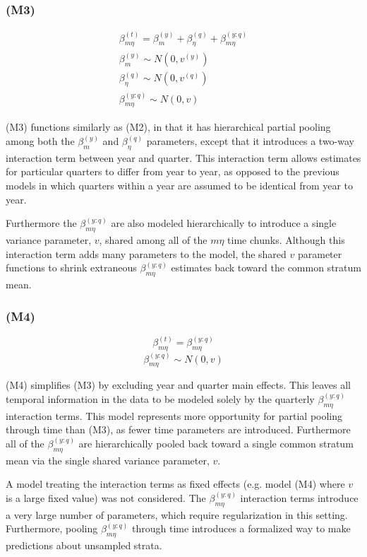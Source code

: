\documentclass[12pt]{article}
\begin{document}
\subsubsection{(M3)}\label{m3}

\begin{eqnarray*}
&\beta^{(t)}_{m\eta} = \beta^{(y)}_{m} + \beta^{(q)}_{\eta} + \beta^{(y:q)}_{m\eta} & \\
&\beta^{(y)}_{m} \sim N(0, v^{(y)}) & \\
&\beta^{(q)}_{\eta} \sim N(0, v^{(q)}) & \\
&\beta^{(y:q)}_{m\eta} \sim N(0, v) &
\end{eqnarray*}

(M3) functions similarly as (M2), in that it has hierarchical partial
pooling among both the \(\beta^{(y)}_{m}\) and \(\beta^{(q)}_{\eta}\)
parameters, except that it introduces a two-way interaction term between
year and quarter. This interaction term allows estimates for particular
quarters to differ from year to year, as opposed to the previous models
in which quarters within a year are assumed to be identical from year to
year.

Furthermore the \(\beta^{(y:q)}_{m\eta}\) are also modeled
hierarchically to introduce a single variance parameter, \(v\), shared
among all of the \(m\eta\) time chunks. Although this interaction term
adds many parameters to the model, the shared \(v\) parameter functions
to shrink extraneous \(\beta^{(y:q)}_{m\eta}\) estimates back toward the
common stratum mean.

\subsubsection{(M4)}\label{m4}

\[\beta^{(t)}_{m\eta} = \beta^{(y:q)}_{m\eta}\]
\[\beta^{(y:q)}_{m\eta} \sim N(0, v)\]

(M4) simplifies (M3) by excluding year and quarter main effects. This
leaves all temporal information in the data to be modeled solely by the
quarterly \(\beta^{(y:q)}_{m\eta}\) interaction terms. This model
represents more opportunity for partial pooling through time than (M3),
as fewer time parameters are introduced. Furthermore all of the
\(\beta^{(y:q)}_{m\eta}\) are hierarchically pooled back toward a single
common stratum mean via the single shared variance parameter, \(v\). 

A model treating the interaction terms as fixed effects (e.g. model (M4) where 
$v$ is a large fixed value) was not considered. The \(\beta^{(y:q)}_{m\eta}\) 
interaction terms introduce a very large number of parameters, which require 
regularization in this setting. Furthermore, pooling \(\beta^{(y:q)}_{m\eta}\) 
through time introduces a formalized way to make predictions about unsampled 
strata.
\end{document}
